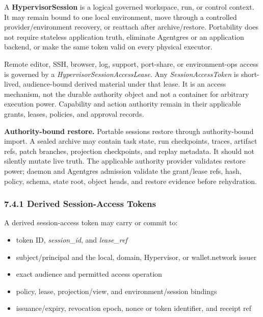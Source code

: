 \documentclass[
  11pt,
]{article}
\providecommand{\tightlist}{%
  \setlength{\itemsep}{0pt}\setlength{\parskip}{0pt}}
\begin{document}
A \textbf{HypervisorSession} is a logical governed workspace, run, or control
context. It may remain bound to one local environment, move through a controlled
provider/environment recovery, or reattach after archive/restore. Portability
does not require stateless application truth, eliminate Agentgres or an
application backend, or make the same token valid on every physical executor.

Remote editor, SSH, browser, log, support, port-share, or environment-ops access
is governed by a \emph{HypervisorSessionAccessLease}. Any
\emph{SessionAccessToken} is short-lived, audience-bound derived material under
that lease. It is an access mechanism, not the durable authority object and not
a container for arbitrary execution power. Capability and action authority
remain in their applicable grants, leases, policies, and approval records.

\textbf{Authority-bound restore.} Portable sessions restore through
authority-bound import. A sealed archive may contain task state, run
checkpoints, traces, artifact refs, patch branches, projection
checkpoints, and replay metadata. It should not silently mutate live
truth. The applicable authority provider validates restore power; daemon and
Agentgres admission validate the grant/lease refs, hash, policy, schema,
state root, object heads, and restore evidence before rehydration.

\hypertarget{the-stateless-authentication-flow}{%
\subsubsection{7.4.1 Derived Session-Access
Tokens}\label{the-stateless-authentication-flow}}

A derived session-access token may carry or commit to:

\begin{itemize}
\tightlist
\item
  token ID, \emph{session\_id}, and \emph{lease\_ref}
\item
  subject/principal and the local, domain, Hypervisor, or wallet.network issuer
\item
  exact audience and permitted access operation
\item
  policy, lease, projection/view, and environment/session bindings
\item
  issuance/expiry, revocation epoch, nonce or token identifier, and receipt ref
\end{itemize}
\end{document}
